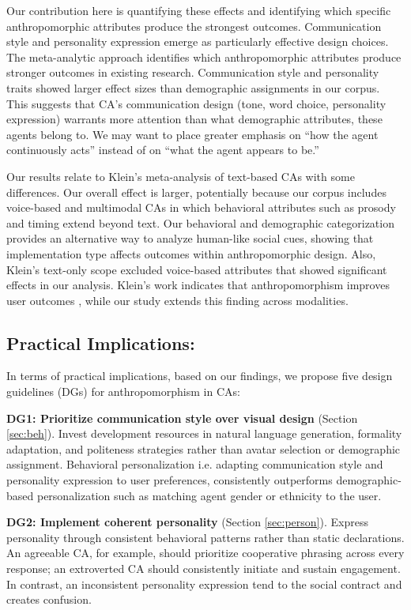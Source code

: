 \documentclass[manuscript,screen,review,anonymous]{acmart}
\DeclareRobustCommand{\change}[1]{%
    \textcolor{changeblue}{#1}%
  }
\DeclareRobustCommand{\change}[1]{#1}
\begin{document}
Our contribution here is quantifying these effects and identifying which specific anthropomorphic attributes produce the strongest outcomes. Communication style and personality expression emerge as particularly effective design choices. The meta-analytic approach identifies which anthropomorphic attributes produce stronger outcomes in existing research. Communication style and personality traits showed larger effect sizes than demographic assignments in our corpus. This suggests that CA's communication design (tone, word choice, personality expression) warrants more attention than what demographic attributes, these agents belong to. We may want to place greater emphasis on  ``how the agent continuously acts'' instead of on ``what the agent appears to be.''

Our results relate to Klein's \cite{klein_effects_2025} meta-analysis of text-based CAs with some differences. Our overall effect is larger, potentially because our corpus includes voice-based and multimodal CAs in which behavioral attributes such as prosody and timing extend beyond text. Our behavioral and demographic categorization provides an alternative way to analyze human-like social cues, showing that implementation type affects outcomes within anthropomorphic design. Also, Klein's text-only scope excluded voice-based attributes that showed significant effects in our analysis. Klein's work indicates that anthropomorphism improves user outcomes \citep{klein_effects_2025}, while our study extends this finding across modalities.

\subsection{Practical Implications: }
In terms of practical implications, based on our findings, we propose \change{five} design guidelines (DGs) for anthropomorphism in CAs:

\textbf{DG1: Prioritize communication style over visual design} (Section \ref{sec:beh}). \change{Invest development resources in natural language generation, formality adaptation, and politeness strategies rather than avatar selection or demographic assignment. Behavioral personalization i.e. adapting communication style and personality expression to user preferences, consistently outperforms demographic-based personalization such as matching agent gender or ethnicity to the user.}
\textbf{DG2: Implement coherent personality} (Section \ref{sec:person}). \change{Express personality through consistent behavioral patterns rather than static declarations. An agreeable CA, for example, should prioritize cooperative phrasing across every response; an extroverted CA should consistently initiate and sustain engagement. In contrast, an inconsistent personality expression tend to the social contract and creates confusion.}
\end{document}
